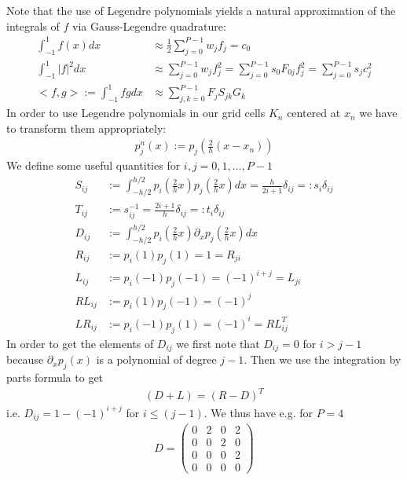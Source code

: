 \documentclass[a4paper,12pt]{scrartcl}
\begin{document}
Note that the use of Legendre polynomials yields a natural approximation of the integrals of $f$
via Gauss-Legendre quadrature:
\begin{align}
   \int_{-1}^1 f(x) dx &\approx  \frac{1}{2}\sum_{j=0}^{P-1} w_j f_j = c_0 \\
   \int_{-1}^1 |f|^2 dx &\approx \sum_{j=0}^{P-1} w_jf_j^2 = \sum_{j=0}^{P-1}s_0 F_{0j}f_j^2 = \sum_{j=0}^{P-1} s_jc_j^2  \\
   <f,g>:=\int_{-1}^1 fg dx &\approx \sum_{j,k=0}^{P-1}F_j S_{jk} G_k
    \label{}
\end{align}
In order to use Legendre polynomials in our grid cells $K_n$ centered at $x_n$
we have to transform them appropriately:
\begin{align}
    p^n_j(x) := p_j( \frac{2}{h}(x-x_n))
    \label{}
\end{align}
We define some useful quantities for $i,j=0,1,\dots,P-1$
\begin{subequations}
    \begin{align}
        S_{ij} &:= \int_{-h/2}^{h/2} p_i(\frac{2}{h} x)p_j(\frac{2}{h} x) dx = \frac{h}{2i+1}\delta_{ij} =: s_i \delta_{ij}\\ 
        T_{ij} &:= s^{-1}_{ij} = \frac{2i+1}{h}\delta_{ij} =: t_i \delta_{ij}\\
        D_{ij} &:= \int_{-h/2}^{h/2} p_i(\frac{2}{h} x)\partial_xp_j(\frac{2}{h} x) dx\\
        R_{ij} &:= p_i(1)p_j(1) = 1 = R_{ji}\\
        L_{ij} &:= p_i(-1)p_j(-1) = (-1)^{i+j} = L_{ji}\\
        RL_{ij}&:= p_i(1)p_j(-1) = (-1)^j\\
        LR_{ij}&:= p_i(-1)p_j(1) = (-1)^i = RL^T_{ij}
        \label{eq:legendre_operators}
    \end{align}
\end{subequations}
In order to get the elements of $D_{ij}$ we first note that $D_{ij} = 0$ for
$i > j-1$ because $\partial_x p_j(x)$ is a polynomial of degree $j-1$. Then
we use the integration by parts formula to get
\begin{align}
    (D+L) = (R-D)^T
    \label{eq:legendre_derivative}
\end{align}
i.e. $D_{ij} = 1 - (-1)^{i+j}$ for $i\le (j-1)$. We thus have e.g. for $P=4$
\begin{align}
    D = \begin{pmatrix}
        0 & 2 & 0 & 2 \\
        0 & 0 & 2 & 0 \\
        0 & 0 & 0 & 2 \\
        0 & 0 & 0 & 0 
    \end{pmatrix}
    \label{eq:example_derivative}
\end{align}
\end{document}
